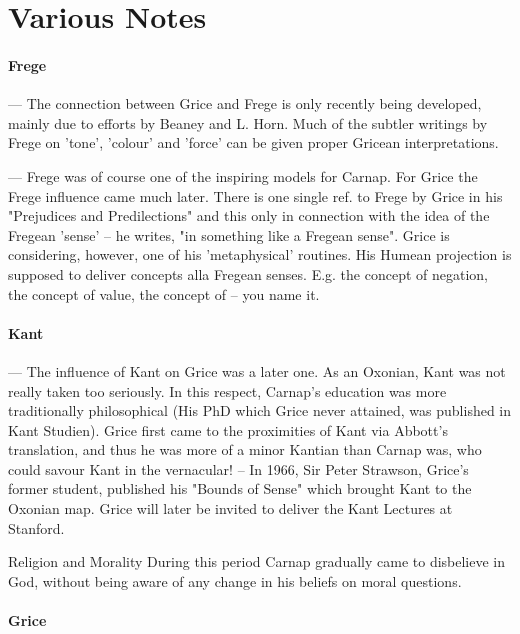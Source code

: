 \documentclass[10pt,titlepage]{book}
\begin{document}
\section{Various Notes}

\paragraph{Frege}

--- The connection between Grice and Frege is only recently being  
developed, mainly due to efforts by Beaney and L. Horn. Much of the subtler  
writings by Frege on 'tone', 'colour' and 'force' can be given proper Gricean  
interpretations.
 
--- Frege was of course one of the inspiring models for Carnap. For  Grice 
the Frege influence came much later. There is one single ref. to Frege by  
Grice in his "Prejudices and Predilections" and this only in connection with 
the  idea of the Fregean 'sense' -- he writes, "in something like a Fregean 
sense".  Grice is considering, however, one of his 'metaphysical' routines. 
His Humean  projection is supposed to deliver concepts alla Fregean senses. 
E.g. the concept  of negation, the concept of value, the concept of -- you 
name it.
 
\paragraph{Kant}

--- The influence of Kant on Grice was a later one. As an Oxonian, Kant was 
 not really taken too seriously. In this respect, Carnap's education was 
more  traditionally philosophical (His PhD which Grice never attained, was 
published  in Kant Studien). Grice first came to the proximities of Kant via 
Abbott's  translation, and thus he was more of a minor Kantian than Carnap 
was, who could  savour Kant in the vernacular! -- In 1966, Sir Peter Strawson, 
Grice's former  student, published his "Bounds of Sense" which brought Kant 
to the Oxonian map.  Grice will later be invited to deliver the Kant 
Lectures at Stanford.
 
  Religion and Morality
During this period  Carnap gradually came to 
disbelieve in God, without being aware of any change in  his beliefs on moral 
questions. 

\paragraph{Grice}
 
\end{document}
